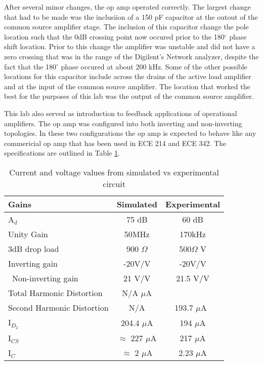 
After several minor changes, the op amp operated correctly. The largest change that had to be made was the inclusiion of a 150 pF capacitor at the outout of the common source amplifier stage. The inclusion of this capacitor change the pole location such that the 0dB crossing point now occured prior to the 180$^\circ$ phase shift location. Prior to this change the amplifier was unstable and did not have a zero crossing that was in the range of the Digilent's Network analyzer, despite the fact that the 180$^\circ$ phase occured at about 200 kHz. Some of the other possible locations for this capacitor include across the drains of the active load amplifier and at the input of the common source amplifier. The location that worked the best for the purposes of this lab was the output of the common source amplifier.

 This lab also served as introduction to feedback applications of operational amplifiers. The op amp was configured into both inverting and non-inverting topologies. In these two configurations the op amp is expected to behave like any commericial op amp that has been used in ECE 214 and ECE 342. The specifications are outlined in Table \ref{tab:specs}.

\begin{table}[H]
	\centering
	\caption{Current and voltage values from simulated vs experimental circuit}
	\label{tab:specs}
	\begin{tabular}{|l|c|c|}                       
		\textbf{Gains} & Simulated & Experimental        \\ \hline
		A$_{d}$ & 75 dB      & 60 dB                                      \\ \hline
		Unity Gain &    50MHz      & 170kHz                    	   \\ \hline
		3dB drop load & 900 $\Omega$         & 500$\Omega$ V                              	       	       \\ \hline
		Inverting gain  & -20V/V                       &  -20V/V                        	   \\ \hline\
		Non-inverting gain & 21 V/V				& 21.5 V/V 	 \\ \hline
		Total Harmonic Distortion           & N/A $\mu$A           &                                \\ \hline
		Second Harmonic Distortion &  N/A             &  193.7 $\mu$A\                                    \\ \hline
		I$_{D_2}$ & 204.4 $\mu$A                  & 194 $\mu$A                                \\ \hline
		I$_{CS}$  & $\approx$  227 $\mu$A               & 217 $\mu$A                            \\ \hline
		I$_{C}$   & $\approx$ 2  $\mu$A				& 2.23 $\mu$A 						 \\	\hline

	\end{tabular}
\end{table}


